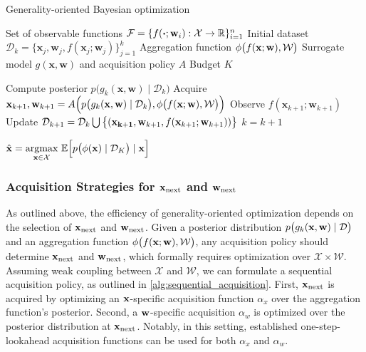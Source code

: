 \begin{algorithm}[t]

\caption{Generality-oriented Bayesian optimization} \label{alg:genbo_general}
\footnotesize
\begin{algorithmic}[1]
\Require
\Statex Set of observable functions  ${\mathcal{F}} = \{ f(\boldsymbol{\cdot}; {\mathbf{w}}_i): {\mathcal{X}} \rightarrow \mathbb{R} \}_{i=1}^{n}$
\Statex Initial dataset $\mathcal{D}_k = \big\{ \mathbf{x}_j, \mathbf{w}_j, f(\mathbf{x}_j; \mathbf{w}_j)  \big\}_{j=1}^k$
\Statex Aggregation function $\phi\big(f({\mathbf{x}}; {\mathbf{w}}), \mathcal{W}\big)$
\Statex Surrogate model $g(\mathbf{x}, \mathbf{w})$ and acquisition policy $A$
\Statex Budget $K$

\vspace{0.2cm}

\State Compute posterior $p\big(g_k (\mathbf{x}, \mathbf{w}) \mid \mathcal{D}_k\big)$
\State Acquire \\ ${\mathbf{x}}_{k+1}, {\mathbf{w}}_{k+1} = A\Big(p\big(g_k (\mathbf{x}, \mathbf{w}) \mid \mathcal{D}_k\big), \phi\big(f({\mathbf{x}}; {\mathbf{w}}), \mathcal{W}\big) \Big)$
\State Observe $f(\mathbf{x}_{k+1}; \mathbf{w}_{k+1})$
\State Update $\mathcal{D}_{k+1} = \mathcal{D}_k \bigcup \big\{ (\mathbf{x_{k+1}}, {\mathbf{w}}_{k+1}, f({\mathbf{x}}_{k+1}; {\mathbf{w}}_{k+1}))  \big\}$
\State $k = k+1$
\EndWhile

\vspace{0.2cm}

\State \Return $\hat{{\mathbf{x}}} = \underset{{\mathbf{x}} \in \mathcal{X}}{\text{argmax}} \ \mathbb{E} \Big[ p\big(\phi (\mathbf{x}) \mid \mathcal{D}_K\big) \mid \mathbf{x} \Big]$
\end{algorithmic}
\end{algorithm}

\subsubsection{Acquisition Strategies for ${\mathbf{x}}_{\text{next}}$ and ${\mathbf{w}}_{\text{next}}$}\label{subsubsec:acquisition_strategies_main}
As outlined above, the efficiency of generality-oriented optimization depends on the selection of ${\mathbf{x}}_{\text{next}}$ and ${\mathbf{w}}_{\text{next}}$. 
Given a posterior distribution $p\big(g_k ({\mathbf{x}}, {\mathbf{w}}) \mid \mathcal{D}\big)$ and an aggregation function $\phi\big(f({\mathbf{x}}; {\mathbf{w}}), \mathcal{W}\big)$, any acquisition policy should determine ${\mathbf{x}}_{\text{next}}$ and ${\mathbf{w}}_{\text{next}}$, which formally requires optimization over $\mathcal{X} \times \mathcal{W}$.
Assuming weak coupling between $\mathcal{X}$ and $\mathcal{W}$, we can formulate a sequential acquisition policy, as outlined in \cref{alg:sequential_acquisition}. 
First, ${\mathbf{x}}_{\text{next}}$ is acquired by optimizing an ${\mathbf{x}}$-specific acquisition function $\alpha_x$ over the aggregation function's posterior. Second, a ${\mathbf{w}}$-specific acquisition $\alpha_w$ is optimized over the posterior distribution at ${\mathbf{x}}_{\text{next}}$. Notably, in this setting, established one-step-lookahead acquisition functions can be used for both $\alpha_x$ and $\alpha_w$. 

